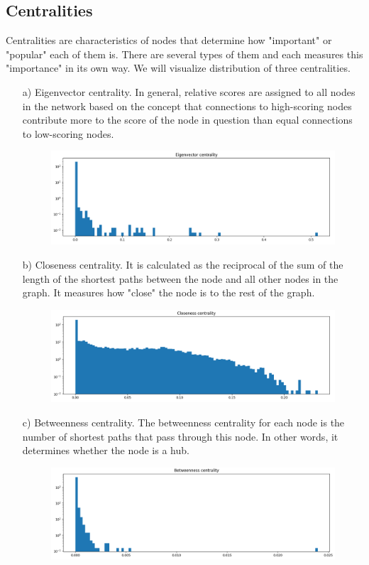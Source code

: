 \documentclass{article}
\newcommand\tab[1][1cm]{\hspace*{#1}}
\begin{document}
\subsection{Centralities}
\tab Centralities are characteristics of nodes that determine how "important" or "popular" each of them is. There are several types of them and each measures this "importance" in its own way. We will visualize distribution of three centralities.
\begin{itemize}
\item[a)] Eigenvector centrality. In general, relative scores are assigned to all nodes in the network based on the concept that connections to high-scoring nodes contribute more to the score of the node in question than equal connections to low-scoring nodes.
\begin{figure}[h]
\centering
\includegraphics[width=1\linewidth]{centralities_eigenvector.png}
\end{figure}
\item[b)] Closeness centrality. It is calculated as the reciprocal of the sum of the length of the shortest paths between the node and all other nodes in the graph. It measures how "close" the node is to the rest of the graph.
\begin{figure}[h]
\centering
\includegraphics[width=1\linewidth]{centralities_closeness.png}
\end{figure}
\item[c)] Betweenness centrality. The betweenness centrality for each node is the number of shortest paths that pass through this node. In other words, it determines whether the node is a hub.
\begin{figure}[h]
\centering
\includegraphics[width=1\linewidth]{centralities_betweenness.png}
\end{figure}
\end{itemize}
\end{document}
